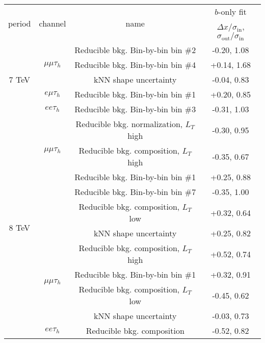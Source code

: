 \begin{tabular}{c c c c } \hline 
\multirow{2}{*}{ period } & \multirow{2}{*}{channel} & \multirow{2}{*}{name} &     $b$-only fit \\
 &  & &  $\Delta x/\sigma_{\text{in}}$, $\sigma_{\text{out}}/\sigma_{\text{in}}$ \\  
\hline
\multirow{5}{*}{ 7 TeV } & \multirow{3}{*}{ $\mu\mu\tau_h$ } & Reducible bkg. Bin-by-bin bin \#2   &      -0.20, 1.08 \\
& & Reducible bkg. Bin-by-bin bin \#4      &      +0.14, 1.68 \\
& & kNN shape uncertainty           &      -0.04, 0.83 \\
 \cline{2-4}
& $e\mu\tau_h$ & Reducible bkg. Bin-by-bin bin \#1      &      +0.20, 0.85 \\
 \cline{2-4}
& $ee\tau_h$ & Reducible bkg. Bin-by-bin bin \#3      &      -0.31, 1.03 \\
 \hline
\multirow{11}{*}{ 8 TeV } & \multirow{3}{*}{ $\mu\mu\tau_h$ } & Reducible bkg. normalization, $L_T$ high   &      -0.30, 0.95 \\
& & Reducible bkg. composition, $L_T$ high    &      -0.35, 0.67  \\
& & Reducible bkg. Bin-by-bin bin \#1 &      +0.25, 0.88 \\
& & Reducible bkg. Bin-by-bin bin \#7 &      -0.35, 1.00 \\
& & Reducible bkg. composition, $L_T$ low     &      +0.32, 0.64  \\
& & kNN shape uncertainty          &      +0.25, 0.82  \\
 \cline{2-4}
& \multirow{4}{*}{ $\mu\mu\tau_h$ } & Reducible bkg. composition, $L_T$ high    &      +0.52, 0.74 \\
& & Reducible bkg. Bin-by-bin bin \#1 &      +0.32, 0.91 \\
& & Reducible bkg. composition, $L_T$ low     &      -0.45, 0.62  \\
& & kNN shape uncertainty          &      -0.03, 0.73  \\
 \cline{2-4}
& $ee\tau_h$ & Reducible bkg. composition           &      -0.52, 0.82 \\
 \hline
\end{tabular}

